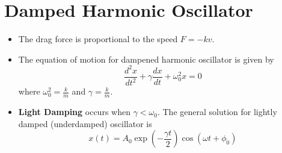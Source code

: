 \section{Damped Harmonic Oscillator}
\begin{itemize}
    \item The drag force is proportional to the speed $F = -kv$.
    \item The equation of motion for dampened harmonic oscillator is given by 
    \begin{equation}
        \frac{d^2x}{dt^2}+\gamma \frac{dx}{dt} + \omega_0^2 x = 0
    \end{equation}
    where $\omega_0^2 = \frac{k}{m}$ and $\gamma = \frac{k}{m}.$
    \item \textbf{Light Damping} occurs when $\gamma < \omega_0$.  The general solution for lightly damped (underdamped) oscillator is 
    \begin{equation}
        x(t) = A_0 \exp\left(-\frac{\gamma t}{2}\right)\cos(\omega t + \phi_0)
    \end{equation}
\end{itemize}